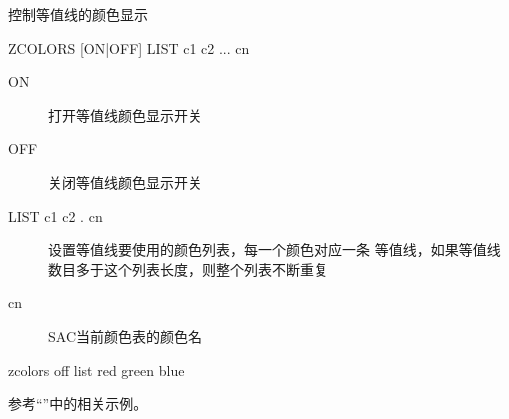 \label{cmd:zcolors}

控制等值线的颜色显示

\begin{SACSTX}
ZCOLORS [ON|OFF] LIST c1 c2 ... cn
\end{SACSTX}

\begin{description}
\item [ON] 打开等值线颜色显示开关
\item [OFF] 关闭等值线颜色显示开关
\item [LIST c1 c2 . cn] 设置等值线要使用的颜色列表，每一个颜色对应一条
    等值线，如果等值线数目多于这个列表长度，则整个列表不断重复
\item [cn] SAC当前颜色表的颜色名
\end{description}

\begin{SACDFT}
zcolors off list red green blue
\end{SACDFT}

参考``''中的相关示例。
